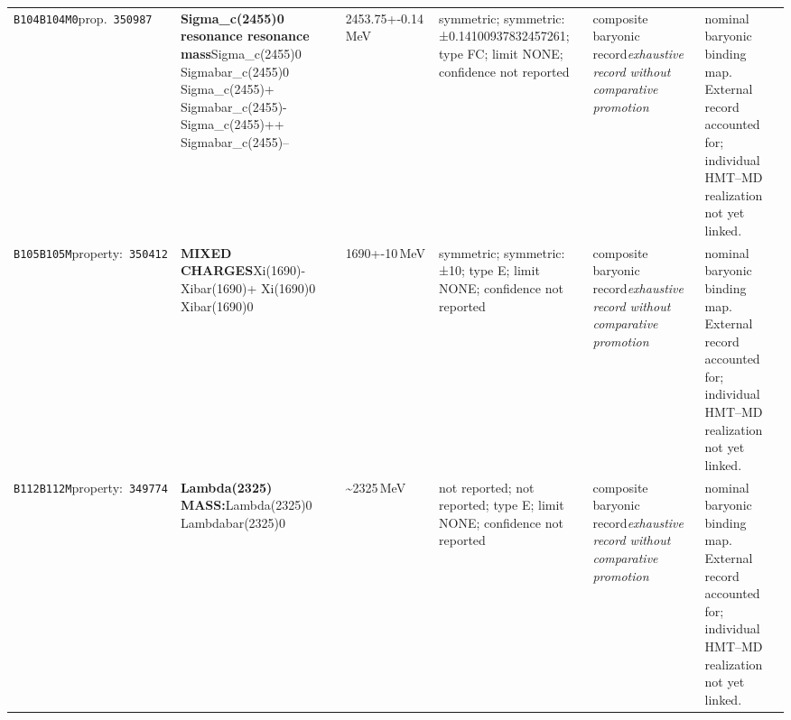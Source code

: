 \begin{landscape}
\begin{longtable}{L{1.85cm}L{4.45cm}L{2.35cm}L{4.05cm}L{3.35cm}L{7.15cm}}
\texttt{B104}\newline \texttt{B104M0}\newline prop.\ \texttt{350987} & \textbf{Sigma\_\allowbreak{}c(2455)0 resonance resonance mass}\newline Sigma\_\allowbreak{}c(2455)0 \textbar{}\allowbreak{} Sigmabar\_\allowbreak{}c(2455)0 \textbar{}\allowbreak{} Sigma\_\allowbreak{}c(2455)+ \textbar{}\allowbreak{} Sigmabar\_\allowbreak{}c(2455)- \textbar{}\allowbreak{} Sigma\_\allowbreak{}c(2455)++ \textbar{}\allowbreak{} Sigmabar\_\allowbreak{}c(2455)-- & 2453.75+-0.14\,MeV & symmetric; symmetric: ±0.14100937832457261; type FC; limit NONE; confidence not reported & composite baryonic record\newline \emph{exhaustive record without comparative promotion} & nominal baryonic binding map. External record accounted for; individual HMT--MD realization not yet linked. \\
\texttt{B105}\newline \texttt{B105M}\newline property:\ \texttt{350412} & \textbf{MIXED CHARGES}\newline Xi(1690)- \textbar{}\allowbreak{} Xibar(1690)+ \textbar{}\allowbreak{} Xi(1690)0 \textbar{}\allowbreak{} Xibar(1690)0 & 1690+-10\,MeV & symmetric; symmetric: ±10; type E; limit NONE; confidence not reported & composite baryonic record\newline \emph{exhaustive record without comparative promotion} & nominal baryonic binding map. External record accounted for; individual HMT--MD realization not yet linked. \\
\texttt{B112}\newline \texttt{B112M}\newline property:\ \texttt{349774} & \textbf{Lambda(2325) MASS:}\newline Lambda(2325)0 \textbar{}\allowbreak{} Lambdabar(2325)0 & \textasciitilde{}2325\,MeV & not reported; not reported; type E; limit NONE; confidence not reported & composite baryonic record\newline \emph{exhaustive record without comparative promotion} & nominal baryonic binding map. External record accounted for; individual HMT--MD realization not yet linked. \\

\end{longtable}
\end{landscape}
